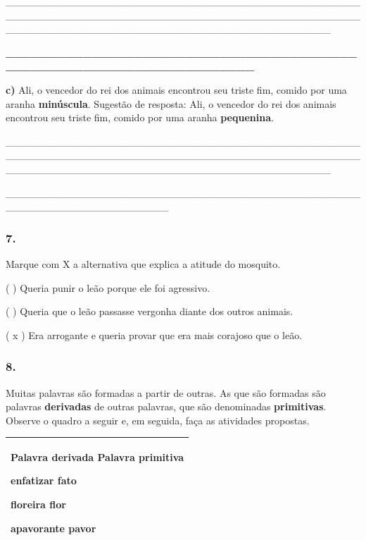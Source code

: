 \_\_\_\_\_\_\_\_\_\_\_\_\_\_\_\_\_\_\_\_\_\_\_\_\_\_\_\_\_\_\_\_\_\_\_\_\_\_\_\_\_\_\_\_\_\_\_\_\_\_\_\_\_\_\_\_\_\_\_\_\_\_\_\_\_\_\_\_\_\_\_\_\_\_\_\_\_\_\_\_\_\_\_\_\_\_\_\_\_\_\_\_\_\_\_\_\_\_\_\_\_\_\_\_\_\_\_\_\_\_\_\_\_\_\_\_\_\_\_\_\_\_\_\_\_\_\_\_\_\_\_\_\_\_\_\_\_\_\_\_

\textbf{\_\_\_\_\_\_\_\_\_\_\_\_\_\_\_\_\_\_\_\_\_\_\_\_\_\_\_\_\_\_\_\_\_\_\_\_\_\_\_\_\_\_\_\_\_\_\_\_\_\_\_\_\_\_\_\_\_\_\_\_\_\_\_\_\_\_\_\_\_\_}

\textbf{c)} Ali, o vencedor do rei dos animais encontrou seu triste fim,
comido por uma aranha \textbf{minúscula}. Sugestão de resposta: Ali, o
vencedor do rei dos animais encontrou seu triste fim, comido por uma
aranha \textbf{pequenina}.

\_\_\_\_\_\_\_\_\_\_\_\_\_\_\_\_\_\_\_\_\_\_\_\_\_\_\_\_\_\_\_\_\_\_\_\_\_\_\_\_\_\_\_\_\_\_\_\_\_\_\_\_\_\_\_\_\_\_\_\_\_\_\_\_\_\_\_\_\_\_\_\_\_\_\_\_\_\_\_\_\_\_\_\_\_\_\_\_\_\_\_\_\_\_\_\_\_\_\_\_\_\_\_\_\_\_\_\_\_\_\_\_\_\_\_\_\_\_\_\_\_\_\_\_\_\_\_\_\_\_\_\_\_\_\_\_\_\_\_\_

\_\_\_\_\_\_\_\_\_\_\_\_\_\_\_\_\_\_\_\_\_\_\_\_\_\_\_\_\_\_\_\_\_\_\_\_\_\_\_\_\_\_\_\_\_\_\_\_\_\_\_\_\_\_\_\_\_\_\_\_\_\_\_\_\_\_\_\_\_\_

\subsubsection{7. }\label{section-6}

Marque com X a alternativa que explica a atitude do mosquito.

( ) Queria punir o leão porque ele foi agressivo.

( ) Queria que o leão passasse vergonha diante dos outros animais.

( x ) Era arrogante e queria provar que era mais corajoso que o leão.

\subsubsection{8. }\label{section-7}

Muitas palavras são formadas a partir de outras. As que são formadas são
palavras \textbf{derivadas} de outras palavras, que são denominadas
\textbf{primitivas}. Observe o quadro a seguir e, em seguida, faça as
atividades propostas.

\begin{longtable}[]{@{}l@{}}
\toprule
\begin{minipage}[t]{0.97\columnwidth}\raggedright\strut
\textbf{Palavra derivada Palavra primitiva}

enfatizar fato

floreira flor

apavorante pavor\strut
\end{minipage}\tabularnewline
\bottomrule
\end{longtable}

